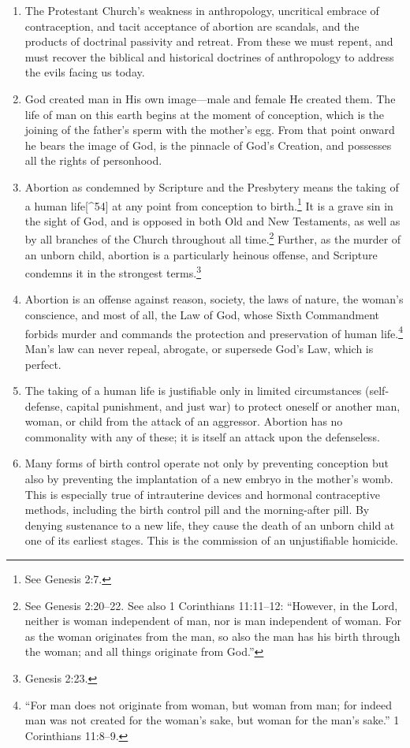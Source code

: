 \documentclass[
]{book}
\begin{document}
\begin{enumerate}
\def\labelenumi{\arabic{enumi}.}
\item
  The Protestant Church's weakness in anthropology, uncritical embrace of contraception, and tacit acceptance of abortion are scandals, and the products of doctrinal passivity and retreat. From these we must repent, and must recover the biblical and historical doctrines of anthropology to address the evils facing us today.
\item
  God created man in His own image---male and female He created them. The life of man on this earth begins at the moment of conception, which is the joining of the father's sperm with the mother's egg. From that point onward he bears the image of God, is the pinnacle of God's Creation, and possesses all the rights of personhood.
\item
  Abortion as condemned by Scripture and the Presbytery means the taking of a human life{[}\^{}54{]} at any point from conception to birth.\footnote{See Genesis 2:7.} It is a grave sin in the sight of God, and is opposed in both Old and New Testaments, as well as by all branches of the Church throughout all time.\footnote{See Genesis 2:20--22. See also 1 Corinthians 11:11--12: ``However, in the Lord, neither is woman independent of man, nor is man independent of woman. For as the woman originates from the man, so also the man has his birth through the woman; and all things originate from God.''} Further, as the murder of an unborn child, abortion is a particularly heinous offense, and Scripture condemns it in the strongest terms.\footnote{Genesis 2:23.}
\item
  Abortion is an offense against reason, society, the laws of nature, the woman's conscience, and most of all, the Law of God, whose Sixth Commandment forbids murder and commands the protection and preservation of human life.\footnote{``For man does not originate from woman, but woman from man; for indeed man was not created for the woman's sake, but woman for the man's sake.'' 1 Corinthians 11:8--9.} Man's law can never repeal, abrogate, or supersede God's Law, which is perfect.
\item
  The taking of a human life is justifiable only in limited circumstances (self-defense, capital punishment, and just war) to protect oneself or another man, woman, or child from the attack of an aggressor. Abortion has no commonality with any of these; it is itself an attack upon the defenseless.
\item
  Many forms of birth control operate not only by preventing conception but also by preventing the implantation of a new embryo in the mother's womb. This is especially true of intrauterine devices and hormonal contraceptive methods, including the birth control pill and the morning-after pill. By denying sustenance to a new life, they cause the death of an unborn child at one of its earliest stages. This is the commission of an unjustifiable homicide.

\end{enumerate}
\end{document}
